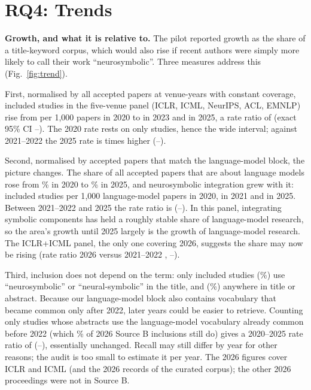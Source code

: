 \section{RQ4: Trends}
\label{sec:trends}



\textbf{Growth, and what it is relative to.} The pilot reported growth as the share of a title-keyword corpus, which would also rise if recent authors were simply more likely to call their work ``neurosymbolic''. Three measures address this (Fig.~\ref{fig:trend}).

First, normalised by all accepted papers at venue-years with constant coverage, included studies in the five-venue panel (ICLR, ICML, NeurIPS, ACL, EMNLP) rise from  per 1{,}000 papers in 2020 to  in 2023 and  in 2025, a rate ratio of  (exact 95\% CI --). The 2020 rate rests on only  studies, hence the wide interval; against 2021--2022 the 2025 rate is  times higher (--).

Second, normalised by accepted papers that match the language-model block, the picture changes. The share of all accepted papers that are about language models rose from \% in 2020 to \% in 2025, and neurosymbolic integration grew with it:  included studies per 1{,}000 language-model papers in 2020,  in 2021 and  in 2025. Between 2021--2022 and 2025 the rate ratio is  (--). In this panel, integrating symbolic components has held a roughly stable share of language-model research, so the area's growth until 2025 largely is the growth of language-model research. The ICLR+ICML panel, the only one covering 2026, suggests the share may now be rising (rate ratio 2026 versus 2021--2022 , --).

Third, inclusion does not depend on the term: only  included studies (\%) use ``neurosymbolic'' or ``neural-symbolic'' in the title, and  (\%) anywhere in title or abstract. Because our language-model block also contains vocabulary that became common only after 2022, later years could be easier to retrieve. Counting only studies whose abstracts use the language-model vocabulary already common before 2022 (which \% of 2026 Source B inclusions still do) gives a 2020--2025 rate ratio of  (--), essentially unchanged. Recall may still differ by year for other reasons; the audit is too small to estimate it per year. The 2026 figures cover ICLR and ICML (and the 2026 records of the curated corpus); the other 2026 proceedings were not in Source B.

